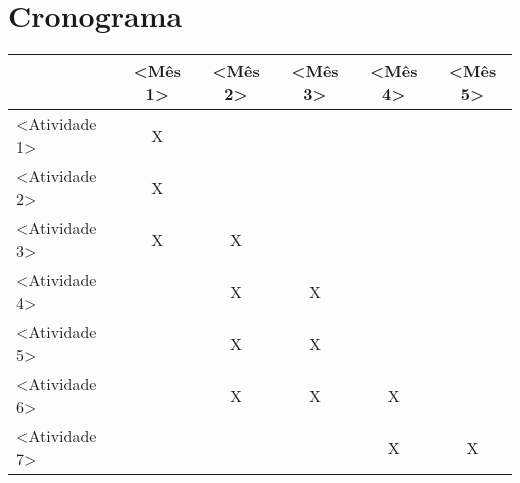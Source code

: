 \section*{Cronograma}

\begin{center}
	\begin{tabular}{|l||c||c||c||c||c|}
		\hline
		 &<Mês 1> &<Mês 2> &<Mês 3> &<Mês 4> &<Mês 5>\\
		\hline
		<Atividade 1> &X & & & &\\
		\hline
		<Atividade 2> &X & & & &\\
		\hline
		<Atividade 3> &X &X & & &\\
		\hline
		<Atividade 4> & &X &X & &\\
		\hline
		<Atividade 5> & &X &X & &\\
		\hline
		<Atividade 6> & &X &X &X &\\
		\hline
		<Atividade 7> & & & &X &X\\
		\hline
	\end{tabular}\\
\end{center}